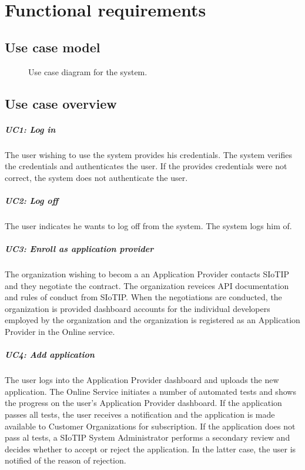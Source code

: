\documentclass[english,peerreview]{sareport}
\begin{document}
\chapter{Functional requirements}\label{sec:functional}
\section*{Use case model}

\begin{figure}[!htp]
    \centering
    \caption{Use case diagram for the system.}\label{fig:use_case_model}
\end{figure}

\section{Use case overview}\label{sec:uc_overview}
\paragraph{UC1: Log in}
The user wishing to use the system provides his credentials.
The system verifies the credentials and authenticates the user.
If the provides credentials were not correct, the system does not authenticate the user.

\paragraph{UC2: Log off}
The user indicates he wants to log off from the system.
The system logs him of.

\paragraph{UC3: Enroll as application provider}
The organization wishing to becom a an Application Provider contacts SIoTIP and they negotiate the contract. The organization reveices API documentation and rules of conduct from SIoTIP. When the negotiations are conducted, the organization is provided dashboard accounts for the individual developers employed by the organization and the organization is registered as an Application Provider in the Online service.

\paragraph{UC4: Add application}
The user logs into the Application Provider dashboard and uploads the new application. The Online Service initiates a number of automated tests and shows the progress on the user's Application Provider dashboard. If the application passes all tests, the user receives a notification and the application is made available to Customer Organizations for subscription. If the application does not pass al tests, a SIoTIP System Administrator performs a secondary review and decides whether to accept or reject the application. In the latter case, the user is notified of the reason of rejection.
\end{document}
